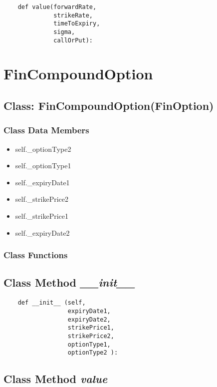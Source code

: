 \documentclass[twoside,11pt]{book}
\begin{document}
\begin{lstlisting}
    def value(forwardRate,
              strikeRate,
              timeToExpiry,
              sigma,
              callOrPut):
\end{lstlisting}

\newpage
\section{FinCompoundOption}

\subsection{Class: FinCompoundOption(FinOption)}


\subsubsection{Class Data Members}
\begin{itemize}
\item{self.\_optionType2}
\item{self.\_optionType1}
\item{self.\_expiryDate1}
\item{self.\_strikePrice2}
\item{self.\_strikePrice1}
\item{self.\_expiryDate2}
\end{itemize}

\subsubsection{Class Functions}

\subsection{Class Method {\it \_\_init\_\_ }}


\begin{lstlisting}
    def __init__ (self,
                  expiryDate1,
                  expiryDate2,
                  strikePrice1,
                  strikePrice2,
                  optionType1,
                  optionType2 ):
\end{lstlisting}

\subsection{Class Method {\it value}}
\end{document}

